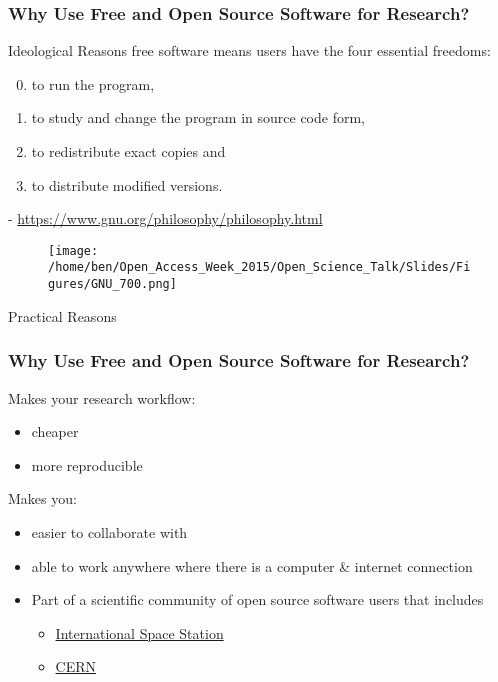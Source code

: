 \documentclass[xcolor=dvipsnames]{beamer}
\begin{document}
\begin{frame}
\frametitle{Why Use Free and Open Source Software for Research?}
\begin{block}{Ideological Reasons}
free software means users have the four essential freedoms: \begin{enumerate}
 \setcounter{enumi}{-1}
 \item to run the program, 
 \item to study and change the program in source code form,
 \item to redistribute exact copies and
 \item to distribute modified versions. \end{enumerate}
\begin{center} \small- \url{https://www.gnu.org/philosophy/philosophy.html}
\end{center}
\end{block}

\begin{center}
\begin{figure}
\texttt{[image: /home/ben/Open\_Access\_Week\_2015/Open\_Science\_Talk/Slides/Figures/GNU\_700.png]}
\end{figure}
\end{center}
\end{frame}


\begin{frame}

\begin{block}{Practical Reasons}
\frametitle{Why Use Free and Open Source Software for Research?}
Makes your research workflow:
\begin{itemize}
\item cheaper
\item more reproducible 
\newline
\end{itemize}

Makes you:
\begin{itemize}
\item easier to collaborate with 
\item able to work anywhere where there is a computer \& internet connection
\item Part of a scientific community of open source software users that includes \begin{itemize}
      \item \href{https://training.linuxfoundation.org/why-our-linux-training/training-reviews/linux-foundation-training-prepares-the-international-space-station-for-linux-migration}{International Space Station} 
      \item \href{https://linux.web.cern.ch/linux/scientific.shtml}{CERN}
\end{itemize}
\end{itemize}

\end{block}

\end{frame}
\end{document}
